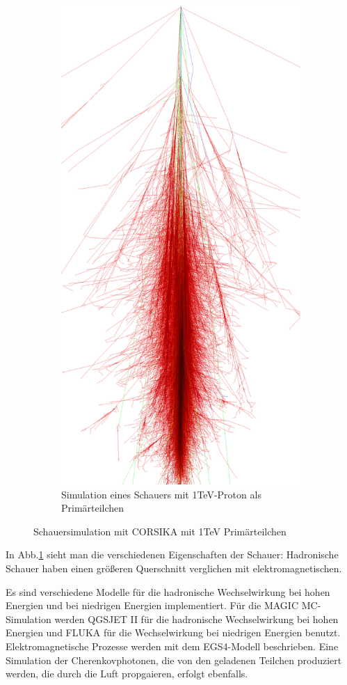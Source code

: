 \begin{figure}
\begin{subfigure}{0.5\linewidth}
  \includegraphics[width=0.7\linewidth]{./Plots/Proton_1TeV_CORSIKA.png}
  \caption{Simulation eines Schauers mit 1TeV-Proton als Primärteilchen}
 \end{subfigure}
  \caption{Schauersimulation mit CORSIKA mit 1TeV Primärteilchen}
  \label{CORSIKA_Schauer}
 \end{figure}



In Abb.\ref{CORSIKA_Schauer} sieht man die verschiedenen Eigenschaften der Schauer: Hadronische Schauer haben einen größeren Querschnitt verglichen mit elektromagnetischen.

Es sind verschiedene Modelle für die hadronische Wechselwirkung bei hohen Energien und bei niedrigen Energien implementiert.
Für die MAGIC MC-Simulation werden QGSJET II für die hadronische Wechselwirkung bei hohen Energien und FLUKA für die Wechselwirkung bei niedrigen Energien benutzt.
Elektromagnetische Prozesse werden mit dem EGS4-Modell beschrieben.
Eine Simulation der Cherenkovphotonen, die von den geladenen Teilchen produziert werden, die durch die Luft propgaieren, erfolgt ebenfalls.

